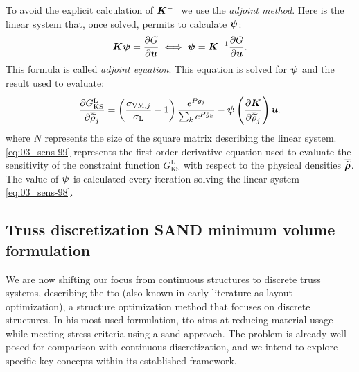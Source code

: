 To avoid the explicit calculation of $\bm{K}^{-1}$ we use the \textit{adjoint method}. Here is the linear system that, once solved, permits to calculate $\bm{\psi}$:
\begin{equation} \label{eq:03_sens-98}
    \bm{K}\bm{\psi} = \frac{\partial G}{\partial\bm{u}} \iff \bm{\psi} = \bm{K}^{-1}\frac{\partial G}{\partial\bm{u}}.
\end{equation}
This formula is called \textit{adjoint equation}. This equation is solved for $\bm{\psi}$ and the result used to evaluate:
\begin{equation}\label{eq:03_sens-99}
\frac{\partial G_{\text{KS}}^\text{L}}{\partial\overline{\widetilde{\rho}}_j} = \left(\frac{ \sigma_{\text{VM},j}}{\sigma_\text{L}}-1 \right) \frac{e^{{P}\bar{g}_j}}{\sum_k e^{{P}\bar{g}_k}} - \bm{\psi} \left(\frac{\partial\bm{K}}{\partial\overline{\widetilde{\rho}}_{j}}\right) \bm{u}.
\end{equation}
 where $N$ represents the size of the square matrix describing the linear system.
\eqref{eq:03_sens-99} represents the first-order derivative equation used to evaluate the sensitivity of the constraint function $G_{\text{KS}}^\text{L}$ with respect to the physical densities $\bm{\overline{\widetilde{\rho}}}$. The value of $\bm{\psi}$ is calculated every iteration solving the linear system \ref{eq:03_sens-98}.

\subsection{Truss discretization SAND minimum volume formulation}
We are now shifting our focus from continuous structures to discrete truss systems, describing the \acrfull{tto} (also known in early literature as layout optimization), a structure optimization method that focuses on discrete structures. In his most used formulation, \gls{tto} aims at reducing material usage while meeting stress criteria using a \gls{sand} approach. The problem is already well-posed for comparison with continuous discretization, and we intend to explore specific key concepts within its established framework.

